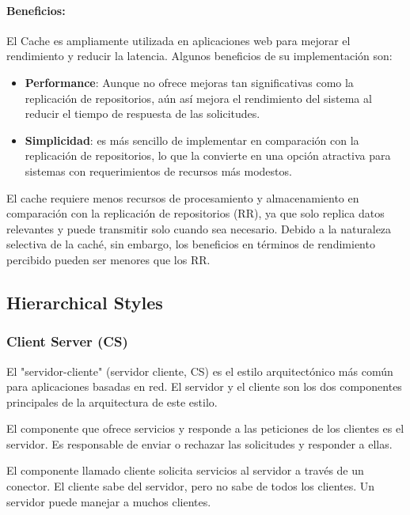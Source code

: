 \documentclass{article}
\begin{document}
		 
		 \paragraph{Beneficios:}		 
			El Cache es ampliamente utilizada en aplicaciones web para mejorar el rendimiento y reducir la latencia. Algunos beneficios de su implementación son:


		 
		 \begin{itemize}	
		 	\item {\textbf{Performance}}: Aunque no ofrece mejoras tan significativas como la replicación de repositorios, aún así mejora el rendimiento del sistema al reducir el tiempo de respuesta de las solicitudes.
		 	
		 	\item {\textbf{Simplicidad}}: es más sencillo de implementar en comparación con la replicación de repositorios, lo que la convierte en una opción atractiva para sistemas con requerimientos de recursos más modestos.
		 	
		 \end{itemize}
		 
		 El cache requiere menos recursos de procesamiento y almacenamiento en comparación con la replicación de repositorios (RR), ya que solo replica datos relevantes y puede transmitir solo cuando sea necesario. Debido a la naturaleza selectiva de la caché, sin embargo, los beneficios en términos de rendimiento percibido pueden ser menores que los RR.
		 
		 
		
		
		
		\subsection{Hierarchical Styles}
		
		\subsubsection{Client Server (CS)}
		El "servidor-cliente" (servidor cliente, CS) es el estilo arquitectónico más común para aplicaciones basadas en red. El servidor y el cliente son los dos componentes principales de la arquitectura de este estilo.
		
		El componente que ofrece servicios y responde a las peticiones de los clientes es el servidor. Es responsable de enviar o rechazar las solicitudes y responder a ellas.
		
		El componente llamado cliente solicita servicios al servidor a través de un conector. El cliente sabe del servidor, pero no sabe de todos los clientes. Un servidor puede manejar a muchos clientes.
		
\end{document}
